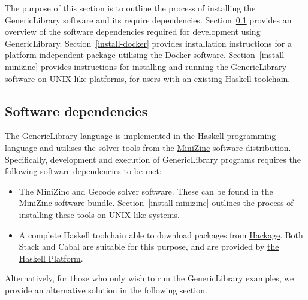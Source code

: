 
The purpose of this section is to outline the process of installing the
GenericLibrary software and its require dependencies. 
Section~\ref{install-overview} provides an overview of the software dependencies 
required for development using GenericLibrary. Section~\ref{install-docker} 
provides installation instructions for a platform-independent package utilising 
the \href{https://www.docker.com/}{Docker} software. Section~\ref{install-minizinc} 
provides instructions for installing and running the GenericLibrary software on 
UNIX-like platforms, for users with an existing Haskell toolchain.


\subsection{Software dependencies}
\label{install-overview}

The GenericLibrary language is implemented in the 
\href{https://www.haskell.org/}{Haskell} programming language and utilises the 
solver tools from the \href{http://www.minizinc.org/}{MiniZinc} software 
distribution. Specifically, development and execution of GenericLibrary programs
requires the following software dependencies to be met:

\begin{itemize}
  \item The MiniZinc and Gecode solver software. These can be found in the 
    MiniZinc software bundle. Section~\ref{install-minizinc} outlines the 
    process of installing these tools on UNIX-like systems.
  \item A complete Haskell toolchain able to download packages from
    \href{https://hackage.haskell.org/}{Hackage}. Both Stack and Cabal are
    suitable for this purpose, and are provided by 
    \href{https://www.haskell.org/platform/}{the Haskell Platform}.
\end{itemize}

Alternatively, for those who only wish to run the GenericLibrary examples, we 
provide an alternative solution in the following section.


